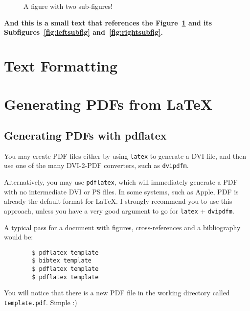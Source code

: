 	
	
	\lipsum[1-3]
	
	\begin{figure}[htbp]
		\centering
		\caption{A figure with two sub-figures!}
		\label{fig:fig2subfig}
	\end{figure}
	
	\textbf{And this is a small text that references the Figure~\ref{fig:fig2subfig} and its Subfigures~\ref{fig:leftsubfig} and~\ref{fig:rightsubfig}.}
	
	\lipsum[1-3]
	
	
	\section{Text Formatting} %
	\label{sec:text_formatting}
	
	
	
	\section{Generating PDFs from \LaTeX} %
	\label{sec:generating_pdfs_from_latex}
	
	\subsection{Generating PDFs with pdflatex} %
	\label{ssec:generating_pdfs_with_pdflatex}
	
	You may create PDF files either by using \verb!latex! to generate a DVI file, and then use one of the many DVI-2-PDF converters, such as \verb!dvipdfm!.
	
	Alternatively, you may use \verb!pdflatex!, which will immediately generate a PDF with no intermediate DVI or PS files. In some systems, such as Apple, PDF is already the default format for \LaTeX. I strongly recommend you to use this approach, unless you have a very good argument to go for \verb!latex! + \verb!dvipdfm!.
	
	A typical pass for a document with figures, cross-references and a bibliography would be:
	\begin{verbatim}
		$ pdflatex template
		$ bibtex template
		$ pdflatex template
		$ pdflatex template
	\end{verbatim}
	You will notice that there is a new PDF file in the working directory called \verb!template.pdf!. Simple :)
	
